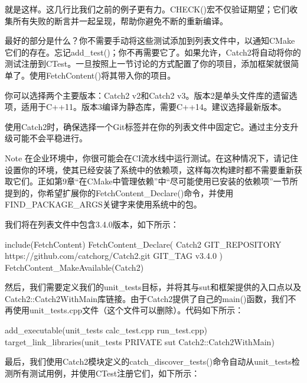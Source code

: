 就是这样。这几行比我们之前的例子更有力。CHECK()宏不仅验证期望；它们收集所有失败的断言并一起呈现，帮助你避免不断的重新编译。

最好的部分是什么？你不需要手动将这些测试添加到列表文件中，以通知CMake它们的存在。忘记add\_test()；你不再需要它了。如果允许，Catch2将自动将你的测试注册到CTest。一旦按照上一节讨论的方式配置了你的项目，添加框架就很简单了。使用FetchContent()将其带入你的项目。

你可以选择两个主要版本：Catch2 v2和Catch2 v3。版本2是单头文件库的遗留选项，适用于C++11。版本3编译为静态库，需要C++14。建议选择最新版本。

使用Catch2时，确保选择一个Git标签并在你的列表文件中固定它。通过主分支升级可能不会平稳进行。

\begin{myNotic}{Note}
在企业环境中，你很可能会在CI流水线中运行测试。在这种情况下，请记住设置你的环境，使其已经安装了系统中的依赖项，这样每次构建时都不需要重新获取它们。正如第9章“在CMake中管理依赖”中“尽可能使用已安装的依赖项”一节所提到的，你希望扩展你的FetchContent\_Declare()命令，并使用FIND\_PACKAGE\_ARGS关键字来使用系统中的包。
\end{myNotic}

我们将在列表文件中包含3.4.0版本，如下所示：


\begin{cmake}
include(FetchContent)
FetchContent_Declare(
    Catch2
    GIT_REPOSITORY https://github.com/catchorg/Catch2.git
    GIT_TAG v3.4.0
)
FetchContent_MakeAvailable(Catch2)
\end{cmake}

然后，我们需要定义我们的unit\_tests目标，并将其与sut和框架提供的入口点以及Catch2::Catch2WithMain库链接。由于Catch2提供了自己的main()函数，我们不再使用unit\_tests.cpp文件（这个文件可以删除）。代码如下所示：


\begin{cmake}
add_executable(unit_tests calc_test.cpp run_test.cpp)
target_link_libraries(unit_tests PRIVATE
                      sut Catch2::Catch2WithMain)
\end{cmake}

最后，我们使用Catch2模块定义的catch\_discover\_tests()命令自动从unit\_tests检测所有测试用例，并使用CTest注册它们，如下所示：



